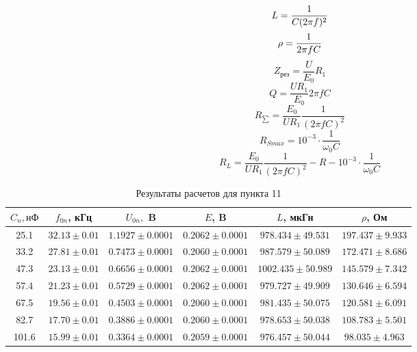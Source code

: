 \documentclass[a4paper]{article}
\begin{document}
\begin{equation}\label{}
L=\frac{1}{C(2\pi f)^2} \\
\end{equation}
\begin{equation}\label{}
\rho=\frac{1}{2\pi fC} \\
\end{equation}
\begin{equation}\label{}
Z_{\text{рез}}=\frac{U}{E_0}R_1
\end{equation}
\begin{equation}\label{}
Q=\frac{UR_1}{E_0}2\pi fC
\end{equation}
\begin{equation}\label{}
R_{\sum}=\frac{E_0}{UR_1}\frac{1}{(2\pi fC)^2}
\end{equation}
\begin{equation}\label{}
R_{Smax}=10^{-3}\cdot\frac{1}{\omega_0C}
\end{equation}
\begin{equation}\label{}
R_L=\frac{E_0}{UR_1}\frac{1}{(2\pi fC)^2}-R-10^{-3}\cdot\frac{1}{\omega_0C}
\end{equation}

    \begin{table}[b!]
	\centering
	\caption{Результаты расчетов для пункта 11}
\begin{tabular}{|c|c|c|c|c|c|}
	\hline
	$ C_n, \text{нФ} $ & $ f_{0n} $, кГц & $ U_{0n}, $ B & $ E $, B & $ L $, мкГн & $ \rho $, Ом \\
	\hline
25.1 & $32.13\pm 0.01$&  $1.1927\pm 0.0001$&  $0.2062\pm 0.0001$&  $978.434\pm 49.531$&  $197.437 \pm 9.933$ \\ \hline
33.2 &  $27.81\pm 0.01$&  $0.7473\pm 0.0001$&  $0.2060\pm 0.0001$&  $987.579\pm 50.089$&  $172.471\pm 8.686$\\ \hline
47.3 & $23.13\pm 0.01$ &  $0.6656\pm 0.0001$&  $0.2062\pm 0.0001$&  $1002.435\pm 50.989$&  $145.579\pm 7.342$ \\ \hline
57.4 &  $21.23\pm 0.01$&  $0.5729\pm 0.0001$&  $0.2062\pm 0.0001$&  $979.727\pm 49.909$& $130.646\pm 6.594$ \\ \hline
67.5 &  $19.56\pm 0.01$&  $0.4503\pm 0.0001$&  $0.2060\pm 0.0001$& $981.435\pm 50.075$&  $120.581 \pm 6.091$\\ \hline 
82.7 & $17.70\pm 0.01$ &  $0.3886\pm 0.0001$&  $0.2060\pm 0.0001$& $978.653\pm 50.038$ & $108.783\pm 5.501$ \\ \hline 
101.6 &  $15.99\pm 0.01$ &  $0.3364\pm 0.0001$&  $0.2059\pm 0.0001$&  $976.457\pm 50.044$&  $98.035\pm 4.963$\\ \hline
\end{tabular}

\end{table}%
\end{document}
